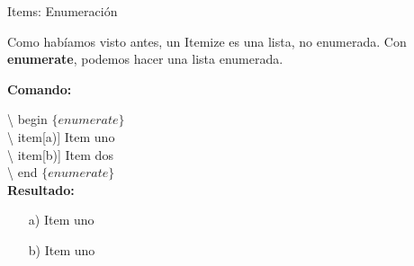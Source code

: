 \begin{frame}{Items: Enumeración}

Como habíamos visto antes, un Itemize es una lista, no enumerada. Con \textbf{enumerate}, podemos hacer una lista enumerada. 

\begin{nada}
\textbf{Comando:}\\
\vspace{5px}

\textbackslash {\color{blue} begin}{\color{blue!40!green} $\{enumerate\}$}\\ \textbackslash {\color{blue} item[a)]} Item uno\\ \textbackslash {\color{blue} item[b)]} Item dos\\
\textbackslash {\color{blue} end}{\color{blue!40!green} $\{enumerate\}$}
\vspace{18px}\\
\textbf{Resultado:}\\
\begin{enumerate}
    \item[a)] Item uno 
    \item[b)] Item uno
\end{enumerate}

\end{nada}

\end{frame}